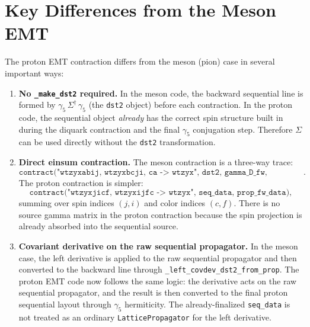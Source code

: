 \documentclass[11pt,a4paper]{article}
\newcommand{\seqprop}{\Sigma}
\begin{document}
\section{Key Differences from the Meson EMT}

The proton EMT contraction differs from the meson (pion) case in several important
ways:

\begin{enumerate}
  \item \textbf{No \texttt{\_make\_dst2} required.}
        In the meson code, the backward sequential line is formed by
        $\gamma_{5}\,\seqprop^{\dagger}\,\gamma_{5}$ (the \texttt{dst2} object)
        before each contraction.  In the proton code, the sequential object
        \emph{already} has the correct spin structure built in during the diquark
        contraction and the final $\gamma_{5}$ conjugation step.  Therefore
        $\seqprop$ can be used directly without the \texttt{dst2} transformation.

  \item \textbf{Direct einsum contraction.}
        The meson contraction is a three-way trace:
        \begin{equation}
          \texttt{contract("wtzyxabij, wtzyxbcji, ca -> wtzyx", dst2, gamma\_D\_fw, src\_gamma)}.
        \end{equation}
        The proton contraction is simpler:
        \begin{equation}
          \texttt{contract("wtzyxjicf, wtzyxijfc -> wtzyx", seq\_data, prop\_fw\_data)},
        \end{equation}
        summing over spin indices $(j,i)$ and color indices $(c,f)$.  There is no
        source gamma matrix in the proton contraction because the spin projection
        is already absorbed into the sequential source.

  \item \textbf{Covariant derivative on the raw sequential propagator.}
        In the meson case, the left derivative is applied to the raw sequential
        propagator and then converted to the backward line through
        \texttt{\_left\_covdev\_dst2\_from\_prop}.  The proton EMT code now follows
        the same logic: the derivative acts on the raw sequential propagator, and
        the result is then converted to the final proton sequential layout through
        $\gamma_{5}$ hermiticity.  The already-finalized \texttt{seq\_data} is not
        treated as an ordinary \texttt{LatticePropagator} for the left derivative.


\end{enumerate}
\end{document}
